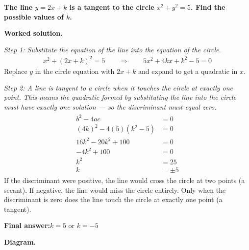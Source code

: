 \documentclass[11pt]{article}
\newcommand{\question}[1]{\par\medskip\noindent\textbf{#1}\par}
\begin{document}
\question{The line \( y = 2x + k \) is a tangent to the circle \( x^2 + y^2 = 5 \). Find the possible values of \( k \).}

\textbf{Worked solution.}

\textit{Step 1: Substitute the equation of the line into the equation of the circle.}
\[\begin{gathered}
x^2 + (2x+k)^2 = 5 \quad\quad \Rightarrow \quad\quad 5x^2 + 4kx + k^2 - 5 = 0
\end{gathered}\]
Replace \(y\) in the circle equation with \(2x + k\) and expand to get a quadratic in \(x\).

\textit{Step 2: A line is tangent to a circle when it touches the circle at exactly one point. This means the quadratic formed by substituting the line into the circle must have exactly one solution --- so the discriminant must equal zero.}
\[\begin{gathered}
\begin{aligned} b^2 - 4ac &= 0 \\ (4k)^2 - 4(5)(k^2-5) &= 0 \\ 16k^2 - 20k^2 + 100 &= 0 \\ -4k^2 + 100 &= 0 \\ k^2 &= 25 \\ k &= \pm 5 \end{aligned}
\end{gathered}\]
If the discriminant were positive, the line would cross the circle at two points (a secant). If negative, the line would miss the circle entirely. Only when the discriminant is zero does the line touch the circle at exactly one point (a tangent).

\begin{answerbox}
\textbf{Final answer:}\quad \(\displaystyle k = 5\) or \(\displaystyle k = -5\)
\end{answerbox}
\textbf{Diagram.}
\end{document}
